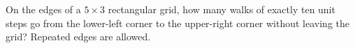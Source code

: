 On the edges of a $5\times3$ rectangular grid, how many walks of exactly ten unit steps go from the lower-left corner to the upper-right corner without leaving the grid? Repeated edges are allowed.

